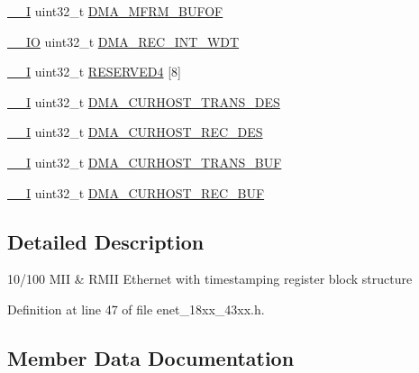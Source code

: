 \begin{DoxyCompactItemize}
\hyperlink{core__sc300_8h_af63697ed9952cc71e1225efe205f6cd3}{\+\_\+\+\_\+I} uint32\+\_\+t \hyperlink{struct_l_p_c___e_n_e_t___t_a8719fee21ce86bb85852bcae7c9e9d41}{D\+M\+A\+\_\+\+M\+F\+R\+M\+\_\+\+B\+U\+F\+OF}
\item 
\hyperlink{core__sc300_8h_aec43007d9998a0a0e01faede4133d6be}{\+\_\+\+\_\+\+IO} uint32\+\_\+t \hyperlink{struct_l_p_c___e_n_e_t___t_a5d84431eff3b2cbf7e7b5980d53e40c4}{D\+M\+A\+\_\+\+R\+E\+C\+\_\+\+I\+N\+T\+\_\+\+W\+DT}
\item 
\hyperlink{core__sc300_8h_af63697ed9952cc71e1225efe205f6cd3}{\+\_\+\+\_\+I} uint32\+\_\+t \hyperlink{struct_l_p_c___e_n_e_t___t_a359c6aa65fdf45ad2f6a685a085ab40a}{R\+E\+S\+E\+R\+V\+E\+D4} \mbox{[}8\mbox{]}
\item 
\hyperlink{core__sc300_8h_af63697ed9952cc71e1225efe205f6cd3}{\+\_\+\+\_\+I} uint32\+\_\+t \hyperlink{struct_l_p_c___e_n_e_t___t_a9617f3c2b1c6570b83c3a141b44d60b5}{D\+M\+A\+\_\+\+C\+U\+R\+H\+O\+S\+T\+\_\+\+T\+R\+A\+N\+S\+\_\+\+D\+ES}
\item 
\hyperlink{core__sc300_8h_af63697ed9952cc71e1225efe205f6cd3}{\+\_\+\+\_\+I} uint32\+\_\+t \hyperlink{struct_l_p_c___e_n_e_t___t_a8cfb91312f7523cafe9262a5fd7044ab}{D\+M\+A\+\_\+\+C\+U\+R\+H\+O\+S\+T\+\_\+\+R\+E\+C\+\_\+\+D\+ES}
\item 
\hyperlink{core__sc300_8h_af63697ed9952cc71e1225efe205f6cd3}{\+\_\+\+\_\+I} uint32\+\_\+t \hyperlink{struct_l_p_c___e_n_e_t___t_af7ea747447f59d49955992496b8a8fa6}{D\+M\+A\+\_\+\+C\+U\+R\+H\+O\+S\+T\+\_\+\+T\+R\+A\+N\+S\+\_\+\+B\+UF}
\item 
\hyperlink{core__sc300_8h_af63697ed9952cc71e1225efe205f6cd3}{\+\_\+\+\_\+I} uint32\+\_\+t \hyperlink{struct_l_p_c___e_n_e_t___t_aa74b714ede45abe6b74d5857a4bd23b9}{D\+M\+A\+\_\+\+C\+U\+R\+H\+O\+S\+T\+\_\+\+R\+E\+C\+\_\+\+B\+UF}
\end{DoxyCompactItemize}


\subsection{Detailed Description}
10/100 M\+II \& R\+M\+II Ethernet with timestamping register block structure 

Definition at line 47 of file enet\+\_\+18xx\+\_\+43xx.\+h.



\subsection{Member Data Documentation}
\mbox{\label{struct_l_p_c___e_n_e_t___t_ae107a92b0d9c6b4c0fae7a96ba13b81f}} 
